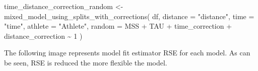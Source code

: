 \documentclass[fleqn,10pt,lineno]{wlpeerj} %
\newenvironment{Shaded}{\begin{snugshade}}{\end{snugshade}}
\newcommand{\AttributeTok}[1]{\textcolor[rgb]{0.77,0.63,0.00}{#1}}
\newcommand{\DecValTok}[1]{\textcolor[rgb]{0.00,0.00,0.81}{#1}}
\newcommand{\FunctionTok}[1]{\textcolor[rgb]{0.00,0.00,0.00}{#1}}
\newcommand{\NormalTok}[1]{#1}
\newcommand{\OtherTok}[1]{\textcolor[rgb]{0.56,0.35,0.01}{#1}}
\newcommand{\SpecialCharTok}[1]{\textcolor[rgb]{0.00,0.00,0.00}{#1}}
\newcommand{\StringTok}[1]{\textcolor[rgb]{0.31,0.60,0.02}{#1}}
\begin{document}
\begin{Shaded}
\begin{Highlighting}[]
\NormalTok{time\_distance\_correction\_random }\OtherTok{\textless{}{-}} 
  \FunctionTok{mixed\_model\_using\_splits\_with\_corrections}\NormalTok{(}
\NormalTok{    df,}
    \AttributeTok{distance =} \StringTok{"distance"}\NormalTok{,}
    \AttributeTok{time =} \StringTok{"time"}\NormalTok{,}
    \AttributeTok{athlete =} \StringTok{"Athlete"}\NormalTok{,}
    \AttributeTok{random =}\NormalTok{ MSS }\SpecialCharTok{+}\NormalTok{ TAU }\SpecialCharTok{+}\NormalTok{ time\_correction }\SpecialCharTok{+}\NormalTok{ distance\_correction }\SpecialCharTok{\textasciitilde{}} \DecValTok{1}
\NormalTok{  )}
\end{Highlighting}
\end{Shaded}

The following image represents model fit estimator RSE for each model. As can be seen, RSE is reduced the more flexible the model.
\end{document}

